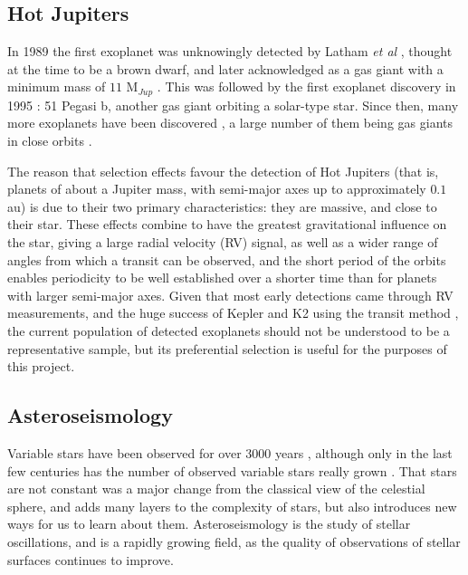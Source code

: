 \documentclass[11pt]{amsart}
\begin{document}
\subsection{Hot Jupiters} \label{Intro:HotJupiters}

In 1989 the first exoplanet was unknowingly detected by Latham \textit{et al} \cite{Latham1989}, thought at the time to be a brown dwarf, and later acknowledged as a gas giant with a minimum mass of $11$ M$_{Jup}$ \cite{Wang2012}.  This was followed by the first exoplanet discovery in 1995 \cite{Mayor1995}: 51 Pegasi b, another gas giant orbiting a solar-type star.  Since then, many more exoplanets have been discovered \cite{NASAExoplanet}, a large number of them being gas giants in close orbits \cite{Winn2014}.

The reason that selection effects favour the detection of Hot Jupiters (that is, planets of about a Jupiter mass, with semi-major axes up to approximately $0.1$ au) is due to their two primary characteristics: they are massive, and close to their star.  These effects combine to have the greatest gravitational influence on the star, giving a large radial velocity (RV) signal, as well as a wider range of angles from which a transit can be observed, and the short period of the orbits enables periodicity to be well established over a shorter time than for planets with larger semi-major axes.  Given that most early detections came through RV measurements, and the huge success of Kepler and K2 using the transit method \cite{Coughlin2016}, the current population of detected exoplanets should not be understood to be a representative sample, but its preferential selection is useful for the purposes of this project.




\subsection{Asteroseismology} \label{Intro:Asteroseismology}

Variable stars have been observed for over $3000$ years \cite{Jetsu2015}, although only in the last few centuries has the number of observed variable stars really grown \cite{Hoffleit1997}.  That stars are not constant was a major change from the classical view of the celestial sphere, and adds many layers to the complexity of stars, but also introduces new ways for us to learn about them.  Asteroseismology is the study of stellar oscillations, and is a rapidly growing field, as the quality of observations of stellar surfaces continues to improve.
\end{document}
